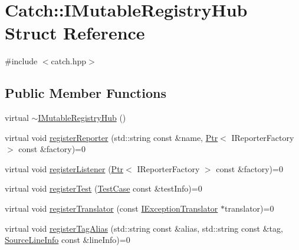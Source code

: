 \hypertarget{structCatch_1_1IMutableRegistryHub}{\section{Catch\-:\-:I\-Mutable\-Registry\-Hub Struct Reference}
\label{structCatch_1_1IMutableRegistryHub}
}


{\ttfamily \#include $<$catch.\-hpp$>$}

\subsection*{Public Member Functions}
\begin{DoxyCompactItemize}
\item 
virtual \hyperlink{structCatch_1_1IMutableRegistryHub_a759ca1e044e19f905fb4d306f1367193}{$\sim$\-I\-Mutable\-Registry\-Hub} ()
\item 
virtual void \hyperlink{structCatch_1_1IMutableRegistryHub_aab72d0aa1fa14627f1a6a4c893ae0a12}{register\-Reporter} (std\-::string const \&name, \hyperlink{classCatch_1_1Ptr}{Ptr}$<$ I\-Reporter\-Factory $>$ const \&factory)=0
\item 
virtual void \hyperlink{structCatch_1_1IMutableRegistryHub_ae06fcb90ba3f2b389d450cd81e229276}{register\-Listener} (\hyperlink{classCatch_1_1Ptr}{Ptr}$<$ I\-Reporter\-Factory $>$ const \&factory)=0
\item 
virtual void \hyperlink{structCatch_1_1IMutableRegistryHub_a11b85c6744d88c9f83fe16ad4a8dd451}{register\-Test} (\hyperlink{classCatch_1_1TestCase}{Test\-Case} const \&test\-Info)=0
\item 
virtual void \hyperlink{structCatch_1_1IMutableRegistryHub_ae6825365102693cf7707db022a2c2b49}{register\-Translator} (const \hyperlink{structCatch_1_1IExceptionTranslator}{I\-Exception\-Translator} $\ast$translator)=0
\item 
virtual void \hyperlink{structCatch_1_1IMutableRegistryHub_abf2e386b6f94f615719ada711adbf822}{register\-Tag\-Alias} (std\-::string const \&alias, std\-::string const \&tag, \hyperlink{structCatch_1_1SourceLineInfo}{Source\-Line\-Info} const \&line\-Info)=0
\end{DoxyCompactItemize}


